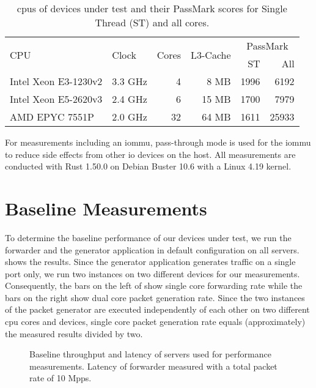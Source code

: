 \begin{table}
    \centering
    \begin{tabular}{l|l|r|r|r|r}
        \multirow{2}{*}{CPU} & \multirow{2}{*}{Clock} & \multirow{2}{*}{Cores} &
        \multirow{2}{*}{L3-Cache} & \multicolumn{2}{c}{PassMark} \\
        & & & & ST & All \\ \hline

        Intel Xeon E3-1230v2 & 3.3 GHz &  4 &  8 MB & 1996 &  6192 \\ \hline
        Intel Xeon E5-2620v3 & 2.4 GHz &  6 & 15 MB & 1700 &  7979 \\ \hline
        AMD EPYC 7551P       & 2.0 GHz & 32 & 64 MB & 1611 & 25933 \\
    \end{tabular}

    \caption{\acsp{cpu} of devices under test and their PassMark scores for
    Single Thread (ST) and all cores.}
    \label{tab:cpus}
\end{table}

For measurements including an \ac{iommu}, pass-through mode is used for the
\ac{iommu} to reduce side effects from other \ac{io} devices on the host. All
measurements are conducted with Rust 1.50.0 on Debian Buster 10.6 with a Linux
4.19 kernel.


\section{Baseline Measurements}
\label{sec:baseline_measurements}

To determine the baseline performance of our devices under test, we run the
forwarder and the generator application in default configuration on all servers.
 shows the results. Since the generator application
generates traffic on a single port only, we run two instances on two different
devices for our measurements. Consequently, the bars on the left of
 show single core forwarding rate while the
bars on the right show dual core packet generation rate. Since the two instances
of the packet generator are executed independently of each other on two
different \ac{cpu} cores and devices, single core packet generation rate equals
(approximately) the measured results divided by two.

\begin{figure}%
	\centering

    \caption{Baseline throughput and latency of servers used for performance
    measurements. Latency of forwarder measured with a total packet rate of 10
    Mpps.}
	\label{fig:baseline-perf}
\end{figure}

